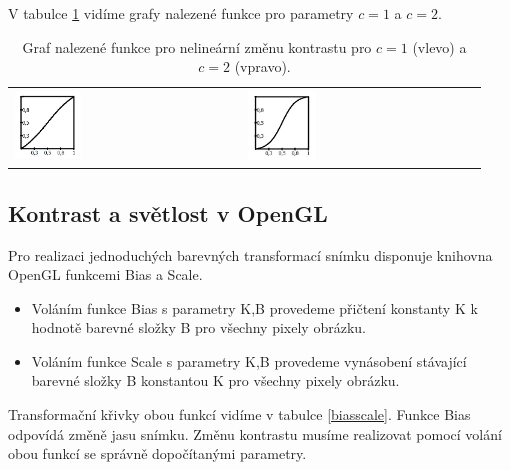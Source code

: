 V tabulce \ref{kontrast} vidíme grafy nalezené funkce pro parametry $c=1$ a $c=2$.


\noindent
\begin{table}[ht]
	\label{kontrast}
	\centering
		\begin{tabular}{p{}p{}}
			\includegraphics[width=0.3\textwidth,height=0.3\textwidth]{Text/IMG/nelinearni1.jpg}
		&
			\includegraphics[width=0.3\textwidth,height=0.3\textwidth]{Text/IMG/nelinearni2.jpg}
		\end{tabular}
	\caption{Graf nalezené funkce pro nelineární změnu kontrastu pro $c=1$ (vlevo) a $c=2$ (vpravo).}
\end{table}


\newpage
\subsection{Kontrast a světlost v OpenGL}
Pro realizaci jednoduchých barevných transformací snímku disponuje knihovna OpenGL funkcemi Bias a Scale.

\begin{itemize}
\item Voláním funkce Bias s parametry K,B provedeme přičtení konstanty K k hodnotě barevné složky B pro všechny pixely obrázku.
\item Voláním funkce Scale s parametry K,B provedeme vynásobení stávající barevné složky B konstantou K pro všechny pixely obrázku.
\end{itemize}

Transformační křivky obou funkcí vidíme v tabulce \ref{biasscale}. Funkce Bias odpovídá změně jasu snímku. Změnu kontrastu musíme realizovat pomocí volání obou funkcí se správně dopočítanými parametry.

